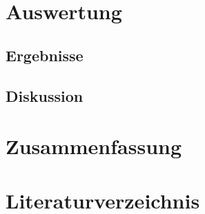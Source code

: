 \documentclass[12pt, a4paper]{article}
\begin{document}
\newpage
\section{Auswertung}
\subsection{Ergebnisse}
\subsection{Diskussion}



\newpage
\section{Zusammenfassung}




\newpage
\section{Literaturverzeichnis}
\printbibliography
\end{document}
